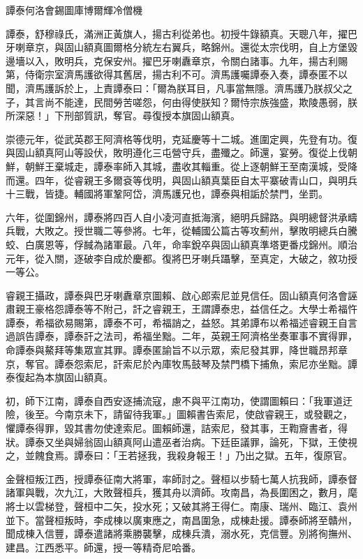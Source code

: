 
\begin{pinyinscope}
譚泰何洛會錫圖庫博爾輝冷僧機

譚泰，舒穆祿氏，滿洲正黃旗人，揚古利從弟也。初授牛錄額真。天聰八年，擢巴牙喇章京，與固山額真圖爾格分統左右翼兵，略錦州。還從太宗伐明，自上方堡毀邊墻以入，敗明兵，克保安州。擢巴牙喇纛章京，令關白諸事。九年，揚古利賜第，侍衛宗室濟馬護欲得其舊居，揚古利不可。濟馬護囑譚泰入奏，譚泰匿不以聞，濟馬護訴於上，上責譚泰曰：「爾為朕耳目，凡事當無隱。濟馬護乃朕叔父之子，其言尚不能達，民間勞苦嗟怨，何由得使朕知？爾恃宗族強盛，欺陵愚弱，朕所深惡！」下刑部質訊，奪官。尋復授本旗固山額真。

崇德元年，從武英郡王阿濟格等伐明，克延慶等十二城。進圍定興，先登有功。復與固山額真阿山等設伏，敗明遵化三屯營守兵，盡殲之。師還，宴勞。復從上伐朝鮮，朝鮮王棄城走，譚泰率師入其城，盡收其輜重。從上逐朝鮮王至南漢城，受降而還。四年，從睿親王多爾袞等伐明，與固山額真葉臣自太平寨破青山口，與明兵十三戰，皆捷。輔國將軍鞏阿岱，濟馬護兄也，譚泰與相詬於禁門，坐罰。

六年，從圍錦州，譚泰將四百人自小凌河直抵海濱，絕明兵歸路。與明總督洪承疇兵戰，大敗之。授世職二等參將。七年，從輔國公篇古等攻薊州，擊敗明總兵白騰蛟、白廣恩等，俘馘為諸軍最。八年，命率銳卒與固山額真準塔更番戍錦州。順治元年，從入關，逐破李自成於慶都。復將巴牙喇兵躡擊，至真定，大破之，敘功授一等公。

睿親王攝政，譚泰與巴牙喇纛章京圖賴、啟心郎索尼並見信任。固山額真何洛會誣肅親王豪格怨譚泰等不附己，訐之睿親王，王謂譚泰忠，益信任之。大學士希福忤譚泰，希福欲易賜第，譚泰不可，希福誚之，益怒。其弟譚布以希福述睿親王自言過誤告譚泰，譚泰訐之法司，希福坐黜。二年，英親王阿濟格坐奏軍事不實得罪，命譚泰與鰲拜等集眾宣其罪。譚泰匿諭旨不以示眾，索尼發其罪，降世職昂邦章京，奪官。譚泰怨索尼，訐索尼於內庫牧馬鼓琴及禁門橋下捕魚，索尼亦坐黜。譚泰復起為本旗固山額真。

初，師下江南，譚泰自西安逐捕流寇，慮不與平江南功，使謂圖賴曰：「我軍道迂險，後至。今南京未下，請留待我軍。」圖賴書告索尼，使啟睿親王，或發觀之，懼譚泰得罪，毀其書勿使達索尼。圖賴師還，詰索尼，發其事，王鞫齎書者，得狀。譚泰又坐與婦翁固山額真阿山遣巫者治病。下廷臣議罪，論死，下獄，王使視之，並餽食焉。譚泰曰：「王若拯我，我殺身報王！」乃出之獄。五年，復原官。

金聲桓叛江西，授譚泰征南大將軍，率師討之。聲桓以步騎七萬人抗我師，譚泰督諸軍與戰，次九江，大敗聲桓兵，獲其舟以濟師。攻南昌，為長圍困之，數月，麾將士以雲梯登，聲桓中二矢，投水死；又破其將王得仁。南康、瑞州、臨江、袁州並下。當聲桓叛時，李成棟以廣東應之，南昌圍急，成棟赴援。譚泰師將至贛州，聞成棟入信豐，譚泰遣諸將乘勝襲擊，成棟兵潰，溺水死，克信豐。別將徇撫州、建昌。江西悉平。師還，授一等精奇尼哈番。


\end{pinyinscope}
